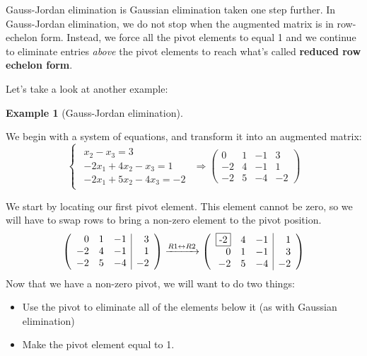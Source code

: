 \documentclass[
]{article}
\theoremstyle{definition}
\theoremstyle{definition}
\newtheorem{example}{Example}[section]
\theoremstyle{definition}
\theoremstyle{definition}
\theoremstyle{remark}
\begin{document}
Gauss-Jordan elimination is Gaussian elimination taken one step further. In Gauss-Jordan elimination, we do not stop when the augmented matrix is in row-echelon form. Instead, we force all the pivot elements to equal 1 and we continue to eliminate entries \emph{above} the pivot elements to reach what's called \textbf{reduced row echelon form}.

Let's take a look at another example:

\begin{example}[Gauss-Jordan elimination]
\protect\hypertarget{exm:gaussjordan}{}\label{exm:gaussjordan}

We begin with a system of equations, and transform it into an augmented matrix:
\[\begin{cases}\begin{align}
x_2 -x_3= 3\\
-2x_1+4x_2-x_3 = 1\\
-2x_1+5x_2-4x_3 =-2\end{align}\end{cases}
 \Longrightarrow \left(\begin{array}{rrr|r}0&1&-1&3\\-2&4&-1&1\\-2&5&-4&-2\end{array}\right) \]

We start by locating our first pivot element. This element cannot be zero, so we will have to swap rows to bring a non-zero element to the pivot position.
\[\left(\begin{array}{rrr|r}0&1&-1&3\\-2&4&-1&1\\-2&5&-4&-2\end{array}\right) \xrightarrow{R1\leftrightarrow R2}
\left(\begin{array}{rrr|r}\fbox{-2}&4&-1&1\\0&1&-1&3\\-2&5&-4&-2\end{array}\right)\]
Now that we have a non-zero pivot, we will want to do two things:

\begin{itemize}
\item Use the pivot to eliminate all of the elements below it (as with Gaussian elimination) \item Make the pivot element equal to 1.
\end{itemize}


\end{example}
\end{document}
